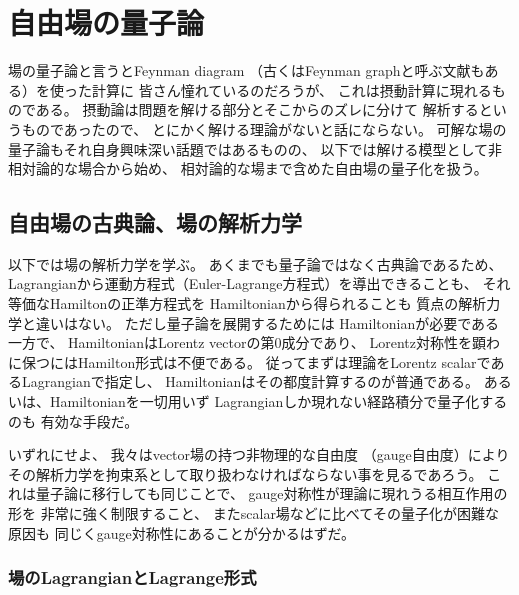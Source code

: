 \section{自由場の量子論}
\label{sec: QFT}

場の量子論と言うとFeynman diagram
（古くはFeynman graphと呼ぶ文献もある）を使った計算に
皆さん憧れているのだろうが、
これは摂動計算に現れるものである。
摂動論は問題を解ける部分とそこからのズレに分けて
解析するというものであったので、
とにかく解ける理論がないと話にならない。
可解な場の量子論もそれ自身興味深い話題ではあるものの、
以下では解ける模型として非相対論的な場合から始め、
相対論的な場まで含めた自由場の量子化を扱う。

\subsection{自由場の古典論、場の解析力学}

以下では場の解析力学を学ぶ。
あくまでも量子論ではなく古典論であるため、
Lagrangianから運動方程式（Euler-Lagrange方程式）を導出できることも、
それ等価なHamiltonの正準方程式を
Hamiltonianから得られることも
質点の解析力学と違いはない。
ただし量子論を展開するためには
Hamiltonianが必要である一方で、
HamiltonianはLorentz vectorの第0成分であり、
Lorentz対称性を顕わに保つにはHamilton形式は不便である。
従ってまずは理論をLorentz scalarであるLagrangianで指定し、
Hamiltonianはその都度計算するのが普通である。
あるいは、Hamiltonianを一切用いず
Lagrangianしか現れない経路積分で量子化するのも
有効な手段だ。

いずれにせよ、
我々はvector場の持つ非物理的な自由度
（gauge自由度）により
その解析力学を拘束系として取り扱わなければならない事を見るであろう。
これは量子論に移行しても同じことで、
gauge対称性が理論に現れうる相互作用の形を
非常に強く制限すること、
またscalar場などに比べてその量子化が困難な原因も
同じくgauge対称性にあることが分かるはずだ。

\subsubsection{場のLagrangianとLagrange形式}


